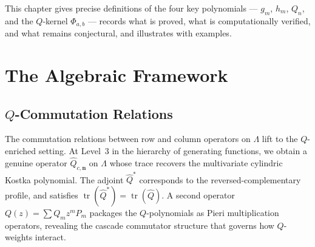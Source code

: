 \documentclass[11pt]{report}
\newcommand{\La}{\Lambda}
\DeclareMathOperator{\tr}{tr}
\theoremstyle{plain}
\theoremstyle{definition}
\begin{document}
This chapter gives precise definitions of the four key
polynomials --- $g_m$, $h_m$, $Q_n$, and the $Q$-kernel
$\Phi_{a,b}$ --- records what is proved, what is
computationally verified, and what remains conjectural,
and illustrates with examples.




\part{The Algebraic Framework}
\label{part:algebraic}


\chapter{$Q$-Commutation Relations}
\label{ch:commutation}

The commutation relations between row and column operators
on $\La$ lift to the $Q$-enriched setting.  At Level~3
in the hierarchy of generating functions, we obtain a
genuine operator $\hat{Q}_{c,\mathbf{n}}$ on $\La$ whose
trace recovers the multivariate cylindric Kostka polynomial.
The adjoint $\hat{Q}^*$ corresponds to the
reversed-complementary profile, and satisfies
$\tr(\hat{Q}^*) = \tr(\hat{Q})$.  A second operator
$Q(z) = \sum Q_m z^m P_m$ packages the $Q$-polynomials as
Pieri multiplication operators, revealing the cascade
commutator structure that governs how $Q$-weights interact.
\end{document}
